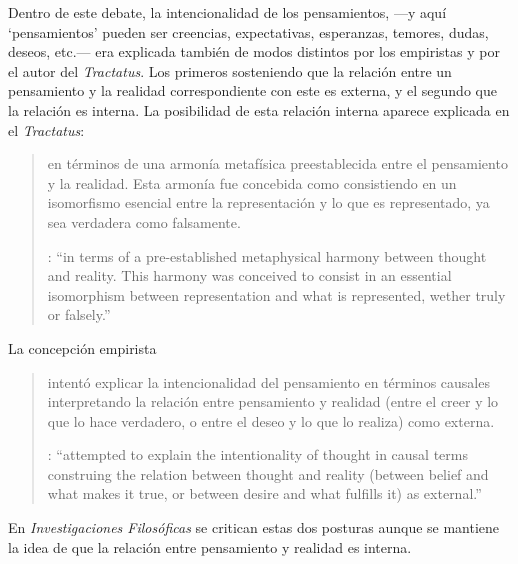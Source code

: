 Dentro de este debate, la intencionalidad de los pensamientos, ---y aquí `pensamientos' pueden ser creencias, expectativas, esperanzas, temores, dudas, deseos, etc.--- era explicada también de modos distintos por los empiristas y por el autor del \emph{Tractatus}. Los primeros sosteniendo que la relación entre un pensamiento y la realidad correspondiente con este es externa, y el segundo que la relación es interna. La posibilidad de esta relación interna aparece explicada en el \emph{Tractatus}: \blockquote[{\cite[3]{hacker2000mind}}: \enquote{in terms of a pre-established metaphysical harmony between thought and reality. This harmony was conceived to consist in an essential isomorphism between representation and what is represented, wether truly or falsely.}]{en términos de una armonía metafísica preestablecida entre el pensamiento y la realidad. Esta armonía fue concebida como consistiendo en un isomorfismo esencial entre la representación y lo que es representado, ya sea verdadera como falsamente.} La concepción empirista \blockquote[{\cite[3]{hacker2000mind}}: \enquote{attempted to explain the intentionality of thought in causal terms \textelp{} construing the relation between thought and reality (between belief and what makes it true, or between desire and what fulfills it) as external.}]{intentó explicar la intencionalidad del pensamiento en términos causales \textelp{} interpretando la relación entre pensamiento y realidad (entre el creer y lo que lo hace verdadero, o entre el deseo y lo que lo realiza) como externa.} En \emph{Investigaciones Filosóficas} se critican estas dos posturas aunque se mantiene la idea de que la relación entre pensamiento y realidad es interna.

